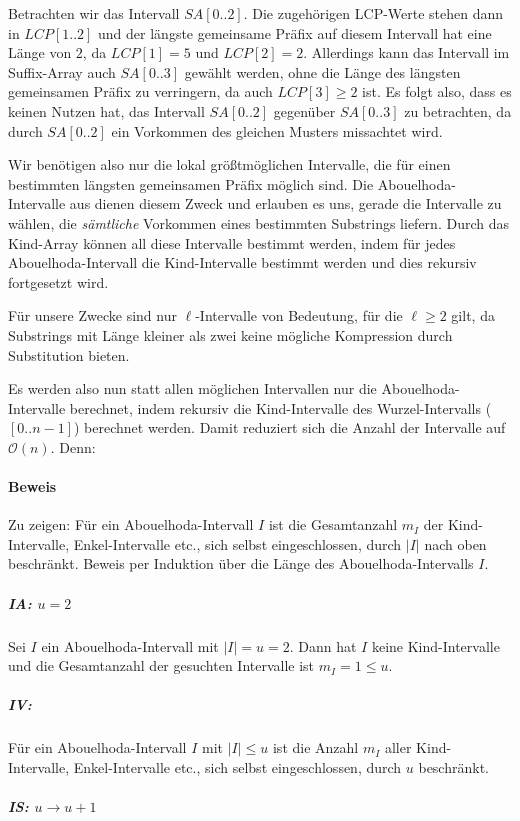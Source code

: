 Betrachten wir das Intervall $SA[0..2]$.
Die zugehörigen LCP-Werte stehen dann in $LCP[1..2]$ und der längste gemeinsame Präfix auf diesem Intervall hat eine Länge von $2$, da $LCP[1] = 5$ und $LCP[2] = 2$. Allerdings kann das Intervall im Suffix-Array auch $SA[0..3]$ gewählt werden, ohne die Länge des längsten gemeinsamen Präfix zu verringern, da auch $LCP[3] \geq 2$ ist. 
Es folgt also, dass es keinen Nutzen hat, das Intervall $SA[0..2]$ gegenüber $SA[0..3]$ zu betrachten, da durch $SA[0..2]$ ein Vorkommen des gleichen Musters missachtet wird.

Wir benötigen also nur die lokal größtmöglichen Intervalle, die für einen bestimmten längsten gemeinsamen Präfix möglich sind. Die Abouelhoda-Intervalle aus \cite{abouelhoda_optimal_2002} dienen diesem Zweck und erlauben es uns, gerade die Intervalle zu wählen, die \emph{sämtliche} Vorkommen eines bestimmten Substrings liefern. Durch das Kind-Array können all diese Intervalle bestimmt werden, indem für jedes Abouelhoda-Intervall die Kind-Intervalle bestimmt werden und dies rekursiv fortgesetzt wird. 

Für unsere Zwecke sind nur $\ell$-Intervalle von Bedeutung, für die $\ell \geq 2$ gilt, da Substrings mit Länge kleiner als zwei keine mögliche Kompression durch Substitution bieten.

Es werden also nun statt allen möglichen Intervallen nur die Abouelhoda-Intervalle berechnet, indem rekursiv die Kind-Intervalle des Wurzel-Intervalls ($[0..n-1]$) berechnet werden. Damit reduziert sich die Anzahl der Intervalle auf $\mathcal{O}(n)$. Denn:

\paragraph{Beweis}
Zu zeigen: Für ein Abouelhoda-Intervall $I$ ist die Gesamtanzahl $m_I$ der Kind-Intervalle, Enkel-Intervalle etc., sich selbst eingeschlossen, durch $|I|$ nach oben beschränkt. Beweis per Induktion über die Länge des Abouelhoda-Intervalls $I$.

\subparagraph{IA: $u = 2$}
Sei $I$ ein Abouelhoda-Intervall mit $|I| = u = 2$. Dann hat $I$ keine Kind-Intervalle und die Gesamtanzahl der gesuchten Intervalle ist $m_I = 1 \leq u$.

\subparagraph{IV:} Für ein Abouelhoda-Intervall $I$ mit $|I| \leq u$ ist die Anzahl $m_I$ aller Kind-Intervalle, Enkel-Intervalle etc., sich selbst eingeschlossen, durch $u$ beschränkt.

\subparagraph{IS: $u \rightarrow u + 1$}

